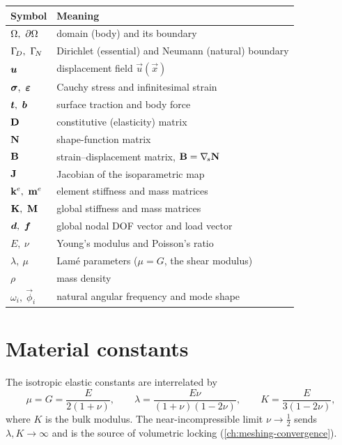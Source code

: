 \begin{tabularx}{\linewidth}{lX}
  \toprule
  Symbol & Meaning \\
  \midrule
  $\domain,\ \boundary$ & domain (body) and its boundary \\
  $\GammaD,\ \GammaN$    & Dirichlet (essential) and Neumann (natural) boundary \\
  $\bm{u}$               & displacement field $\vec{u}(\vec{x})$ \\
  $\stress,\ \strain$   & Cauchy stress and infinitesimal strain \\
  $\traction,\ \bodyforce$ & surface traction and body force \\
  $\mathbf{D}$               & constitutive (elasticity) matrix \\
  $\mathbf{N}$               & shape-function matrix \\
  $\mathbf{B}$               & strain--displacement matrix, $\mathbf{B}=\nabla_{\!s}\mathbf{N}$ \\
  $\mathbf{J}$               & Jacobian of the isoparametric map \\
  $\ke,\ \me$           & element stiffness and mass matrices \\
  $\Kmat,\ \Mmat$       & global stiffness and mass matrices \\
  $\dof,\ \force$       & global nodal DOF vector and load vector \\
  $E,\ \nu$             & Young's modulus and Poisson's ratio \\
  $\lambda,\ \mu$       & Lam\'e parameters ($\mu=G$, the shear modulus) \\
  $\rho$                & mass density \\
  $\omega_i,\ \vec{\phi}_i$ & natural angular frequency and mode shape \\
  \bottomrule
\end{tabularx}

\section{Material constants}

The isotropic elastic constants are interrelated by
\begin{equation}
  \mu = G = \frac{E}{2(1+\nu)}, \qquad
  \lambda = \frac{E\nu}{(1+\nu)(1-2\nu)}, \qquad
  K = \frac{E}{3(1-2\nu)},
\end{equation}
where $K$ is the bulk modulus. The near-incompressible limit
$\nu\to\tfrac12$ sends $\lambda,K\to\infty$ and is the source of
volumetric locking (\cref{ch:meshing-convergence}).
